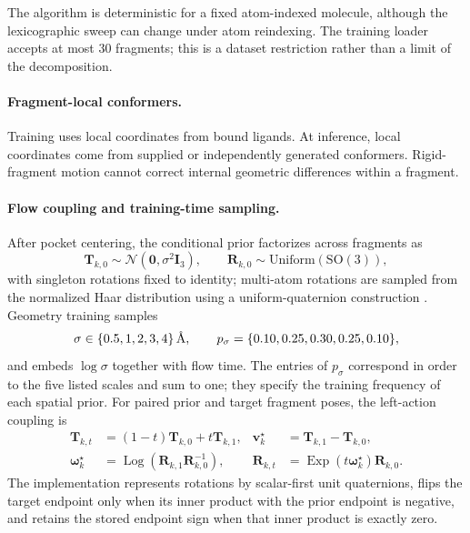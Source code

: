 \documentclass{article}
\renewcommand{\boldsymbol}[1]{\pmb{#1}}
\newcommand{\angstrom}{\text{\normalfont\AA}}
\newcommand{\SO}{\mathrm{SO}}
\newcommand{\citep}[1]{\cite{#1}}
\begin{document}
The algorithm is deterministic for a fixed atom-indexed molecule, although the lexicographic sweep can change under atom reindexing.
The training loader accepts at most 30 fragments; this is a dataset restriction rather than a limit of the decomposition.

\paragraph{Fragment-local conformers.}
Training uses local coordinates from bound ligands. At inference, local coordinates come from supplied or independently generated conformers.
Rigid-fragment motion cannot correct internal geometric differences within a fragment.

\paragraph{Flow coupling and training-time sampling.}
After pocket centering, the conditional prior factorizes across fragments as
\begin{equation}
    \mathbf{T}_{k,0}\sim\mathcal{N}(\mathbf{0},\sigma^2\mathbf{I}_3),
    \qquad
    \mathbf{R}_{k,0}\sim\mathrm{Uniform}(\SO(3)),
    \label{eq:si_pose_prior}
\end{equation}
with singleton rotations fixed to identity; multi-atom rotations are sampled from the normalized Haar distribution using a uniform-quaternion construction \citep{shoemake1992uniform}.
Geometry training samples
\begin{equation}
    \sigma\in\{0.5,1,2,3,4\}\,\angstrom,
    \qquad
    p_{\sigma}=\{0.10,0.25,0.30,0.25,0.10\},
    \label{eq:si_prior_mixture}
\end{equation}
and embeds $\log\sigma$ together with flow time.
The entries of \(p_\sigma\) correspond in order to the five listed scales and sum to one; they specify the training frequency of each spatial prior.
For paired prior and target fragment poses, the left-action coupling is
\begin{align}
    \mathbf{T}_{k,t}
    &=(1-t)\mathbf{T}_{k,0}+t\mathbf{T}_{k,1},
    &
    \mathbf{v}^{\star}_k
    &=\mathbf{T}_{k,1}-\mathbf{T}_{k,0},
    \nonumber\\
    \boldsymbol{\omega}^{\star}_k
    &=\operatorname{Log}(\mathbf{R}_{k,1}\mathbf{R}_{k,0}^{-1}),
    &
    \mathbf{R}_{k,t}
    &=\operatorname{Exp}(t\boldsymbol{\omega}^{\star}_k)\mathbf{R}_{k,0}.
    \label{eq:si_flow_path}
\end{align}
The implementation represents rotations by scalar-first unit quaternions, flips the target endpoint only when its inner product with the prior endpoint is negative, and retains the stored endpoint sign when that inner product is exactly zero.
\end{document}

